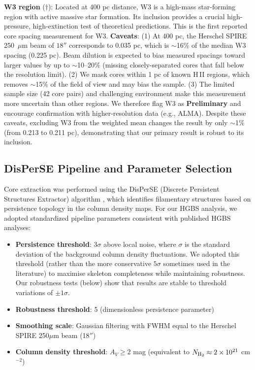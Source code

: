 \documentclass[11pt,a4paper]{article}
\begin{document}
\noindent\textbf{W3 region} ($\dagger$): Located at 400 pc distance, W3 is a high-mass star-forming region with active massive star formation. Its inclusion provides a crucial high-pressure, high-extinction test of theoretical predictions. This is the first reported core spacing measurement for W3. \textbf{Caveats}: (1) At 400 pc, the Herschel SPIRE 250~$\mu$m beam of $18''$ corresponds to 0.035 pc, which is $\sim$16\% of the median W3 spacing (0.225 pc). Beam dilution is expected to bias measured spacings toward larger values by up to $\sim$10--20\% (missing closely-separated cores that fall below the resolution limit). (2) We mask cores within 1 pc of known H\,{\scriptsize II} regions, which removes $\sim$15\% of the field of view and may bias the sample. (3) The limited sample size (42 core pairs) and challenging environment make this measurement more uncertain than other regions. We therefore flag W3 as \textbf{Preliminary} and encourage confirmation with higher-resolution data (e.g., ALMA). Despite these caveats, excluding W3 from the weighted mean changes the result by only $\sim$1\% (from 0.213 to 0.211 pc), demonstrating that our primary result is robust to its inclusion.

\subsection{DisPerSE Pipeline and Parameter Selection}

Core extraction was performed using the DisPerSE (Discrete Persistent Structures Extractor) algorithm \citep{Sousbie2011}, which identifies filamentary structures based on persistence topology in the column density maps. For our HGBS analysis, we adopted standardized pipeline parameters consistent with published HGBS analyses:

\begin{itemize}
    \item \textbf{Persistence threshold}: $3\sigma$ above local noise, where $\sigma$ is the standard deviation of the background column density fluctuations. We adopted this threshold (rather than the more conservative $5\sigma$ sometimes used in the literature) to maximise skeleton completeness while maintaining robustness. Our robustness tests (below) show that results are stable to threshold variations of $\pm 1\sigma$.
    \item \textbf{Robustness threshold}: 5 (dimensionless persistence parameter)
    \item \textbf{Smoothing scale}: Gaussian filtering with FWHM equal to the Herschel SPIRE 250$\mu$m beam (18$''$)
    \item \textbf{Column density threshold}: $A_V \geq 2$ mag (equivalent to $N_{\rm H_2} \approx 2 \times 10^{21}$ cm$^{-2}$)
\end{itemize}
\end{document}
